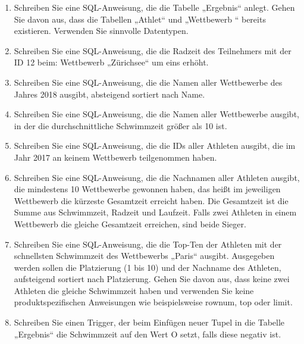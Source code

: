 \documentclass{lehramt-informatik-aufgabe}
\begin{document}
\begin{enumerate}


\item Schreiben Sie eine SQL-Anweisung, die die Tabelle „Ergebnis“
anlegt. Gehen Sie davon aus, dass die Tabellen „Athlet“ und „Wettbewerb
“ bereits existieren. Verwenden Sie sinnvolle Datentypen.


\item Schreiben Sie eine SQL-Anweisung, die die Radzeit des Teilnehmers
mit der ID 12 beim: Wettbewerb „Zürichsee“ um eins erhöht.


\item Schreiben Sie eine SQL-Anweisung, die die Namen aller Wettbewerbe
des Jahres 2018 ausgibt, absteigend sortiert nach Name.


\item Schreiben Sie eine SQL-Anweisung, die die Namen aller Wettbewerbe
ausgibt, in der die durchschnittliche Schwimmzeit größer als 10 ist.


\item Schreiben Sie eine SQL-Anweisung, die die IDs aller Athleten
ausgibt, die im Jahr 2017 an keinem Wettbewerb teilgenommen haben.


\item Schreiben Sie eine SQL-Anweisung, die die Nachnamen aller Athleten
ausgibt, die mindestens 10 Wettbewerbe gewonnen haben, das heißt im
jeweiligen Wettbewerb die kürzeste Gesamtzeit erreicht haben. Die
Gesamtzeit ist die Summe aus Schwimmzeit, Radzeit und Laufzeit. Falls
zwei Athleten in einem Wettbewerb die gleiche Gesamtzeit erreichen, sind
beide Sieger.


\item Schreiben Sie eine SQL-Anweisung, die die Top-Ten der Athleten mit
der schnellsten Schwimmzeit des Wettbewerbs „Paris“ ausgibt. Ausgegeben
werden sollen die Platzierung (1 bis 10) und der Nachname des Athleten,
aufsteigend sortiert nach Platzierung. Gehen Sie davon aus, dass keine
zwei Athleten die gleiche Schwimmzeit haben und verwenden Sie keine
produktspezifischen Anweisungen wie beispielsweise rownum, top oder
limit.


\item Schreiben Sie einen Trigger, der beim Einfügen neuer Tupel in die
Tabelle „Ergebnis“ die Schwimmzeit auf den Wert O setzt, falls diese
negativ ist.

\end{enumerate}
\end{document}
